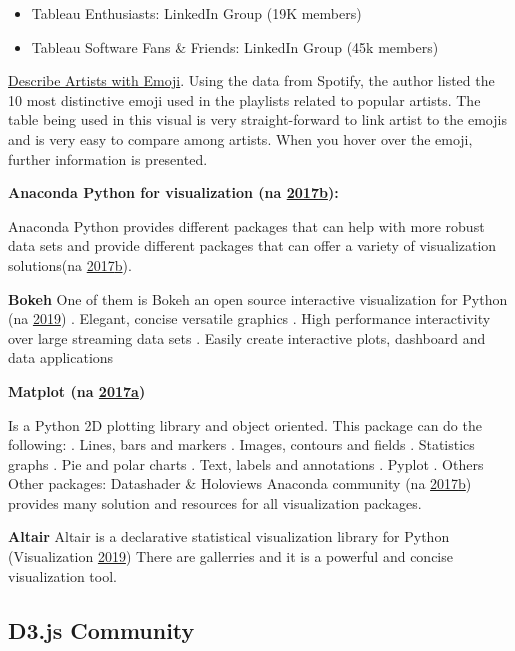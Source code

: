 \documentclass[]{book}
\providecommand{\tightlist}{%
  \setlength{\itemsep}{0pt}\setlength{\parskip}{0pt}}
\begin{document}
\begin{itemize}
\tightlist
\item
  Tableau Enthusiasts: LinkedIn Group (19K members)
\item
  Tableau Software Fans \& Friends: LinkedIn Group (45k members)
\end{itemize}

\href{https://public.tableau.com/en-us/s/gallery/what-emoji-say-about-music?gallery=featured}{Describe Artists with Emoji}. Using the data from Spotify, the author listed the 10 most distinctive emoji used in the playlists related to popular artists. The table being used in this visual is very straight-forward to link artist to the emojis and is very easy to compare among artists. When you hover over the emoji, further information is presented.

\textbf{Anaconda Python for visualization (na \protect\hyperlink{ref-Python2019}{2017}\protect\hyperlink{ref-Python2019}{b}):}

Anaconda Python provides different packages that can help with more robust data sets and provide different packages that can offer a variety of visualization solutions(na \protect\hyperlink{ref-Python2019}{2017}\protect\hyperlink{ref-Python2019}{b}).

\textbf{Bokeh}
One of them is Bokeh an open source interactive visualization for Python (na \protect\hyperlink{ref-Bokeh}{2019})
. Elegant, concise versatile graphics
. High performance interactivity over large streaming data sets
. Easily create interactive plots, dashboard and data applications

\textbf{Matplot (na \protect\hyperlink{ref-Matplot}{2017}\protect\hyperlink{ref-Matplot}{a})}

Is a Python 2D plotting library and object oriented.
This package can do the following:
. Lines, bars and markers
. Images, contours and fields
. Statistics graphs
. Pie and polar charts
. Text, labels and annotations
. Pyplot
. Others
Other packages: Datashader \& Holoviews
Anaconda community (na \protect\hyperlink{ref-Python2019}{2017}\protect\hyperlink{ref-Python2019}{b}) provides many solution and resources for all visualization packages.

\textbf{Altair}
Altair is a declarative statistical visualization library for Python (Visualization \protect\hyperlink{ref-Altair}{2019})
There are gallerries and it is a powerful and concise visualization tool.

\hypertarget{d3.js-community}{%
\subsection{D3.js Community}\label{d3.js-community}}
\end{document}
